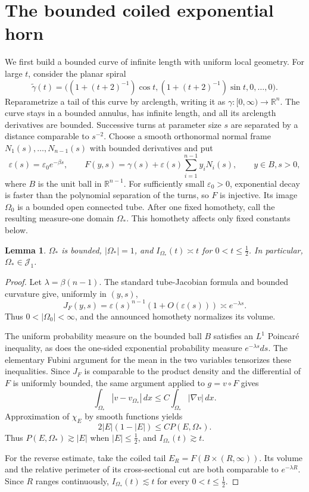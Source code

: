 \documentclass[11pt]{article}
\newtheorem{lemma}[theorem]{Lemma}
\begin{document}
\section{The bounded coiled exponential horn}

We first build a bounded curve of infinite length with uniform local geometry.
For large $t$, consider the planar spiral
\[
 \widetilde\gamma(t)=
 \big((1+(t+2)^{-1})\cos t,
      (1+(t+2)^{-1})\sin t,0,\ldots,0\big).
\]
Reparametrize a tail of this curve by arclength, writing it as
$\gamma:[0,\infty)\to\mathbb R^n$.  The curve stays in a bounded annulus, has
infinite length, and all its arclength derivatives are bounded.  Successive
turns at parameter size $s$ are separated by a distance comparable to
$s^{-2}$.  Choose a smooth orthonormal normal frame
$N_1(s),\ldots,N_{n-1}(s)$ with bounded derivatives and put
\[
 \varepsilon(s)=\varepsilon_0e^{-\beta s},\qquad
 F(y,s)=\gamma(s)+\varepsilon(s)
       \sum_{i=1}^{n-1}y_iN_i(s),\qquad y\in B, s>0,
\]
where $B$ is the unit ball in $\mathbb R^{n-1}$.  For sufficiently small
$\varepsilon_0>0$, exponential decay is faster than the polynomial separation
of the turns, so $F$ is injective.  Its image $\Omega_0$ is a bounded open
connected tube.  After one fixed homothety, call the resulting measure-one
domain $\Omega_*$.  This homothety affects only fixed constants below.

\begin{lemma}\label{lem:horn}
$\Omega_*$ is bounded, $|\Omega_*|=1$, and
$I_{\Omega_*}(t)\asymp t$ for $0<t\leq\tfrac12$.  In particular,
$\Omega_*\in\mathcal J_1$.
\end{lemma}

\begin{proof}
Let $\lambda=\beta(n-1)$.  The standard tube-Jacobian formula and bounded
curvature give, uniformly in $(y,s)$,
\[
 J_F(y,s)=\varepsilon(s)^{n-1}(1+O(\varepsilon(s)))
          \asymp e^{-\lambda s}.
\]
Thus $0<|\Omega_0|<\infty$, and the announced homothety normalizes its volume.

The uniform probability measure on the bounded ball $B$ satisfies an
$L^1$ Poincar\'e inequality, as does the one-sided exponential probability
measure $e^{-\lambda s}ds$.  The elementary Fubini argument for the mean in
the two variables tensorizes these inequalities.  Since $J_F$ is comparable
to the product density and the differential of $F$ is uniformly bounded, the
same argument applied to $g=v\circ F$ gives
\[
 \int_{\Omega_*}|v-v_{\Omega_*}|\,dx
 \leq C\int_{\Omega_*}|\nabla v|\,dx.
\]
Approximation of $\chi_E$ by smooth functions yields
\[
 2|E|(1-|E|)\leq C P(E,\Omega_*).
\]
Thus $P(E,\Omega_*)\gtrsim |E|$ when $|E|\leq\tfrac12$, and
$I_{\Omega_*}(t)\gtrsim t$.

For the reverse estimate, take the coiled tail
$E_R=F(B\times(R,\infty))$.  Its volume and the relative perimeter of its
cross-sectional cut are both comparable to $e^{-\lambda R}$.  Since $R$
ranges continuously, $I_{\Omega_*}(t)\lesssim t$ for every
$0<t\leq\tfrac12$.
\end{proof}
\end{document}
